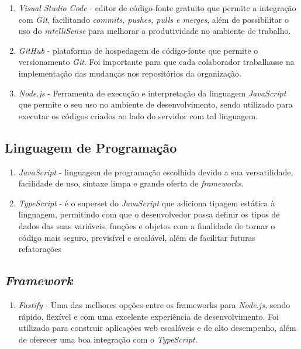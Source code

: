 \begin{enumerate}
	\item\textit{Visual Studio Code} - editor de código-fonte gratuito que permite a integração com \textit{Git}, facilitando \textit{commits, pushes, pulls e merges}, além de possibilitar o uso do \textit{intelliSense} para melhorar a produtividade no ambiente de trabalho.
	
	\item \textit{GitHub} -  plataforma de hospedagem de código-fonte que permite o versionamento \textit{Git}. Foi importante para que cada colaborador trabalhasse na implementação das mudanças nos repositórios da organização.
	
	\item \textit{Node.js} -  Ferramenta de execução e interpretação da linguagem \textit{JavaScript} que permite o seu uso no ambiente de desenvolvimento, sendo utilizado para executar os códigos criados ao lado do servidor com tal linguagem. 
\end{enumerate}


\subsection{Linguagem de Programação}

\begin{enumerate}
	\item \textit{JavaScript} -   linguagem de programação escolhida devido a sua  versatilidade, facilidade de uso, sintaxe limpa e grande oferta de \textit{frameworks.}
	\item \textit{TypeScript} - é o superset do \textit{JavaScript} que adiciona tipagem estática à linguagem,  permitindo com que o desenvolvedor possa definir os tipos de dados das suas variáveis, funções e objetos com a finalidade de tornar o código mais seguro, previsível e escalável, além de facilitar futuras refatorações

\end{enumerate}

\subsection{\textit{Framework}}

\begin{enumerate}
	\item\textit{Fastify} - Uma das melhores opções entre os frameworks para \textit{Node.js,} sendo rápido, flexível e com uma excelente experiência de desenvolvimento. Foi utilizado para construir aplicações web escaláveis e de alto desempenho, além de oferecer uma boa integração com o \textit{TypeScript.} 
\end{enumerate}

